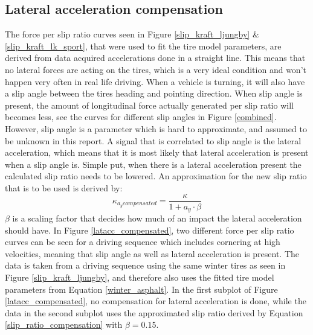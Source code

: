 \subsection{Lateral acceleration compensation}
\label{sec:latacccomp}
The force per slip ratio curves seen in Figure \ref{slip_kraft_ljungby} \& \ref{slip_kraft_lk_sport}, that were used to fit the tire model parameters, are derived from data acquired accelerations done in a straight line. This means that no lateral forces are acting on the tires, which is a very ideal condition and won't happen very often in real life driving. When a vehicle is turning, it will also have a slip angle between the tires heading and pointing direction. When slip angle is present, the amount of longitudinal force actually generated per slip ratio will becomes less, see the curves for different slip angles in Figure \ref{combined}. However, slip angle is a parameter which is hard to approximate, and assumed to be unknown in this report. A signal that is correlated to slip angle is the lateral acceleration, which means that it is most likely that lateral acceleration is present when a slip angle is. Simple put, when there is a lateral acceleration present the calculated slip ratio needs to be lowered. An approximation for the new slip ratio that is to be used is derived by:
\begin{equation}
\label{slip_ratio_compensation}
\kappa_{a_{y} compensated} = \dfrac{\kappa}{1 + a_{y}\cdot \beta}
\end{equation}
$ \beta $ is a scaling factor that decides how much of an impact the lateral acceleration should have. In Figure \ref{latacc_compensated}, two different force per slip ratio curves can be seen for a driving sequence which includes cornering at high velocities, meaning that slip angle as well as lateral acceleration is present. The data is taken from a driving sequence using the same winter tires as seen in Figure \ref{slip_kraft_ljungby}, and therefore also uses the fitted tire model parameters from Equation \ref{winter_asphalt}. In the first subplot of Figure \ref{latacc_compensated}, no compensation for lateral acceleration is done, while the data in the second subplot uses the approximated slip ratio derived by Equation \ref{slip_ratio_compensation} with $ \beta = 0.15 $. 


